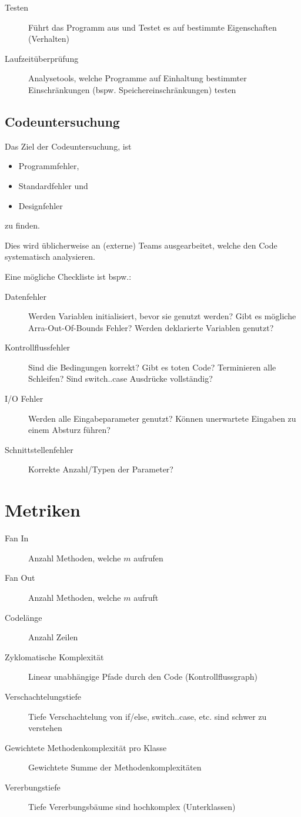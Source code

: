 				\begin{description}
					\item[Testen] Führt das Programm aus und Testet es auf bestimmte Eigenschaften (Verhalten)
					\item[Laufzeitüberprüfung] Analysetools, welche Programme auf Einhaltung bestimmter Einschränkungen (bspw. Speichereinschränkungen) testen
				\end{description}

		\subsection{Codeuntersuchung}
			Das Ziel der Codeuntersuchung, ist
			\begin{itemize}
				\item Programmfehler,
				\item Standardfehler und
				\item Designfehler
			\end{itemize}
			zu finden.

			Dies wird üblicherweise an (externe) Teams ausgearbeitet, welche den Code systematisch analysieren.

			Eine mögliche Checkliste ist bspw.:
			\begin{description}
				\item[Datenfehler] Werden Variablen initialisiert, bevor sie genutzt werden? Gibt es mögliche Arra-Out-Of-Bounds Fehler? Werden deklarierte Variablen genutzt?
				\item[Kontrollflussfehler] Sind die Bedingungen korrekt? Gibt es toten Code? Terminieren alle Schleifen? Sind switch..case Ausdrücke vollständig?
				\item[I/O Fehler] Werden alle Eingabeparameter genutzt? Können unerwartete Eingaben zu einem Absturz führen?
				\item[Schnittstellenfehler] Korrekte Anzahl/Typen der Parameter?
			\end{description}

	\section{Metriken}
		\label{sec:metrics}

		\begin{description}
			\item[Fan In] Anzahl Methoden, welche $ m $ aufrufen
			\item[Fan Out] Anzahl Methoden, welche $ m $ aufruft
			\item[Codelänge] Anzahl Zeilen
			\item[Zyklomatische Komplexität] Linear unabhängige Pfade durch den Code (Kontrollflussgraph)
			\item[Verschachtelungstiefe] Tiefe Verschachtelung von if/else, switch..case, etc. sind schwer zu verstehen
			\item[Gewichtete Methodenkomplexität pro Klasse] Gewichtete Summe der Methodenkomplexitäten
			\item[Vererbungstiefe] Tiefe Vererbungsbäume sind hochkomplex (Unterklassen)
		\end{description}

